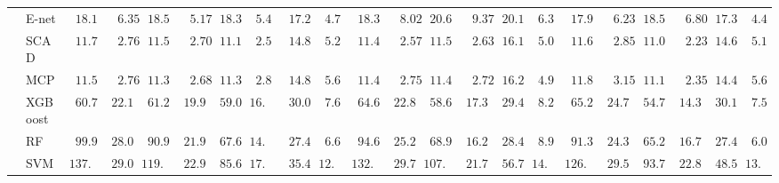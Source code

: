 \begin{tabular}{ll|ll|llllll|llllll|llllll}
 & E-net  & $\phantom{0}18.12$ & $\phantom{00}6.35$ & $\phantom{0}18.58$ & $\phantom{00}5.17$ & $\phantom{0}18.34$ & $\phantom{0}5.48$ & $\phantom{0}17.22$ & $\phantom{0}4.76$ & $\phantom{0}18.31$ & $\phantom{00}8.02$ & $\phantom{0}20.67$ & $\phantom{00}9.37$ & $\phantom{0}20.14$ & $\phantom{0}6.39$ & $\phantom{0}17.95$ & $\phantom{00}6.23$ & $\phantom{0}18.54$ & $\phantom{00}6.80$ & $\phantom{0}17.39$ & $\phantom{0}4.40$ \\
 & SCAD  & $\phantom{0}11.72$ & $\phantom{00}2.76$ & $\phantom{0}11.51$ & $\phantom{00}2.70$ & $\phantom{0}11.18$ & $\phantom{0}2.59$ & $\phantom{0}14.86$ & $\phantom{0}5.24$ & $\phantom{0}11.49$ & $\phantom{00}2.57$ & $\phantom{0}11.56$ & $\phantom{00}2.63$ & $\phantom{0}16.15$ & $\phantom{0}5.04$ & $\phantom{0}11.62$ & $\phantom{00}2.85$ & $\phantom{0}11.04$ & $\phantom{00}2.23$ & $\phantom{0}14.61$ & $\phantom{0}5.16$ \\
 & MCP  & $\phantom{0}11.57$ & $\phantom{00}2.76$ & $\phantom{0}11.38$ & $\phantom{00}2.68$ & $\phantom{0}11.30$ & $\phantom{0}2.82$ & $\phantom{0}14.86$ & $\phantom{0}5.67$ & $\phantom{0}11.43$ & $\phantom{00}2.75$ & $\phantom{0}11.49$ & $\phantom{00}2.72$ & $\phantom{0}16.23$ & $\phantom{0}4.97$ & $\phantom{0}11.83$ & $\phantom{00}3.15$ & $\phantom{0}11.12$ & $\phantom{00}2.35$ & $\phantom{0}14.40$ & $\phantom{0}5.60$ \\
 & XGBoost  & $\phantom{0}60.79$ & $\phantom{0}22.15$ & $\phantom{0}61.23$ & $\phantom{0}19.91$ & $\phantom{0}59.02$ & $16.41$ & $\phantom{0}30.04$ & $\phantom{0}7.65$ & $\phantom{0}64.66$ & $\phantom{0}22.84$ & $\phantom{0}58.64$ & $\phantom{0}17.35$ & $\phantom{0}29.40$ & $\phantom{0}8.20$ & $\phantom{0}65.29$ & $\phantom{0}24.72$ & $\phantom{0}54.70$ & $\phantom{0}14.36$ & $\phantom{0}30.14$ & $\phantom{0}7.51$ \\
 & RF  & $\phantom{0}99.91$ & $\phantom{0}28.06$ & $\phantom{0}90.95$ & $\phantom{0}21.92$ & $\phantom{0}67.66$ & $14.67$ & $\phantom{0}27.40$ & $\phantom{0}6.60$ & $\phantom{0}94.63$ & $\phantom{0}25.22$ & $\phantom{0}68.99$ & $\phantom{0}16.25$ & $\phantom{0}28.45$ & $\phantom{0}8.93$ & $\phantom{0}91.36$ & $\phantom{0}24.31$ & $\phantom{0}65.25$ & $\phantom{0}16.79$ & $\phantom{0}27.45$ & $\phantom{0}6.03$ \\
 & SVM  & $137.17$ & $\phantom{0}29.08$ & $119.12$ & $\phantom{0}22.96$ & $\phantom{0}85.63$ & $17.58$ & $\phantom{0}35.49$ & $12.53$ & $132.14$ & $\phantom{0}29.74$ & $107.00$ & $\phantom{0}21.71$ & $\phantom{0}56.73$ & $14.52$ & $126.79$ & $\phantom{0}29.55$ & $\phantom{0}93.70$ & $\phantom{0}22.88$ & $\phantom{0}48.56$ & $13.77$ \\\hline

\end{tabular}
